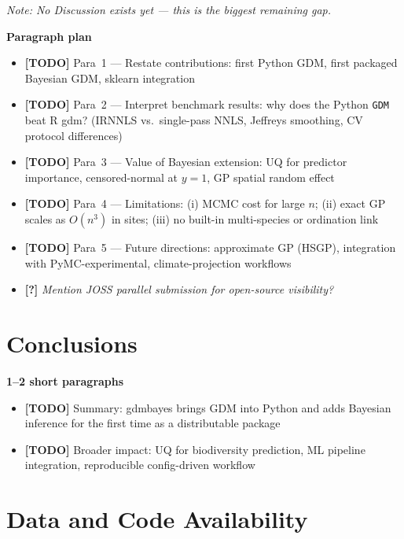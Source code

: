 \documentclass[11pt,a4paper]{article}
\newcommand{\todo}[1]{{\color{todored}\textbf{[TODO]} #1}}
\newcommand{\question}[1]{{\color{questionblue}\textbf{[?]} \textit{#1}}}
\newcommand{\note}[1]{{\color{notegray}\textit{Note: #1}}}
\newenvironment{scaffold}[1]{%
  \begin{mdframed}[backgroundcolor=gray!6, linecolor=gray!30,
                   leftmargin=0pt, rightmargin=0pt,
                   innerleftmargin=8pt, innerrightmargin=8pt,
                   innertopmargin=6pt, innerbottommargin=6pt]
  \noindent\textbf{#1}\par\vspace{2pt}
  \begin{itemize}[leftmargin=1.4em, topsep=2pt, itemsep=1pt, parsep=0pt]
}{%
  \end{itemize}
  \end{mdframed}
  \vspace{4pt}
}
\begin{document}
\note{No Discussion exists yet --- this is the biggest remaining gap.}

\begin{scaffold}{Paragraph plan}
  \item \todo{Para~1 --- Restate contributions: first Python GDM, first
    packaged Bayesian GDM, sklearn integration}
  \item \todo{Para~2 --- Interpret benchmark results: why does the Python
    \texttt{GDM} beat R gdm? (IRNNLS vs.\ single-pass NNLS, Jeffreys
    smoothing, CV protocol differences)}
  \item \todo{Para~3 --- Value of Bayesian extension: UQ for predictor
    importance, censored-normal at $y=1$, GP spatial random effect}
  \item \todo{Para~4 --- Limitations: (i) MCMC cost for large $n$;
    (ii) exact GP scales as $O(n^3)$ in sites; (iii) no built-in
    multi-species or ordination link}
  \item \todo{Para~5 --- Future directions: approximate GP (HSGP),
    integration with PyMC-experimental, climate-projection workflows}
  \item \question{Mention JOSS parallel submission for open-source visibility?}
\end{scaffold}


\section{Conclusions}

\begin{scaffold}{1--2 short paragraphs}
  \item \todo{Summary: gdmbayes brings GDM into Python and adds Bayesian
    inference for the first time as a distributable package}
  \item \todo{Broader impact: UQ for biodiversity prediction, ML pipeline
    integration, reproducible config-driven workflow}
\end{scaffold}


\section{Data and Code Availability}
\end{document}

